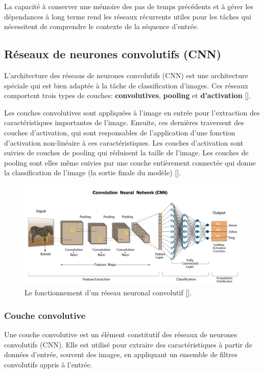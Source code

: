 La capacité à conserver une mémoire des pas de temps précédents et à gérer les
dépendances à long terme rend les réseaux récurrents utiles pour les tâches qui
nécessitent de comprendre le contexte de la séquence d'entrée.

\subsection{Réseaux de neurones convolutifs (CNN)}
L'architecture des réseaus de neurones convolutifs (CNN) est une architecture
spéciale qui est bien adaptée à la tâche de classification d'images. Ces
réseaux comportent trois types de couches: \textbf{convolutives},
\textbf{pooling} et \textbf{d'activation} [\cite{Goodfellow-et-al-2016}].

Les couches convolutives sont appliquées à l'image en entrée pour l’extraction
des caractéristiques importantes de l'image. Ensuite, ces dernières traversent
des couches d'activation, qui sont responsables de l'application d'une fonction
d'activation non-linéaire à ces caractéristiques. Les couches d'activation sont
suivies de couches de pooling qui réduisent la taille de l'image. Les couches
de pooling sont elles même suivies par une couche entièrement connectée qui
donne la classification de l'image (la sortie finale du modèle)
[\cite{Goodfellow-et-al-2016}].

\begin{figure}[hbt!]
	\centering
	\includegraphics[width=15
		cm]{images_pfe/cnn.png}
	\caption{Le fonctionnement d'un réseau neuronal convolutif [\cite{alharbi_hewahi_2021}].}
	\label{fig:cnn}
\end{figure}
\FloatBarrier
\medskip

\subsubsection{Couche convolutive }
Une couche convolutive est un élément constitutif des réseaux de neurones
convolutifs (CNN). Elle est utilisé pour extraire des caractéristiques à partir
de données d'entrée, souvent des images, en appliquant un ensemble de filtres
convolutifs appris à l'entrée.

